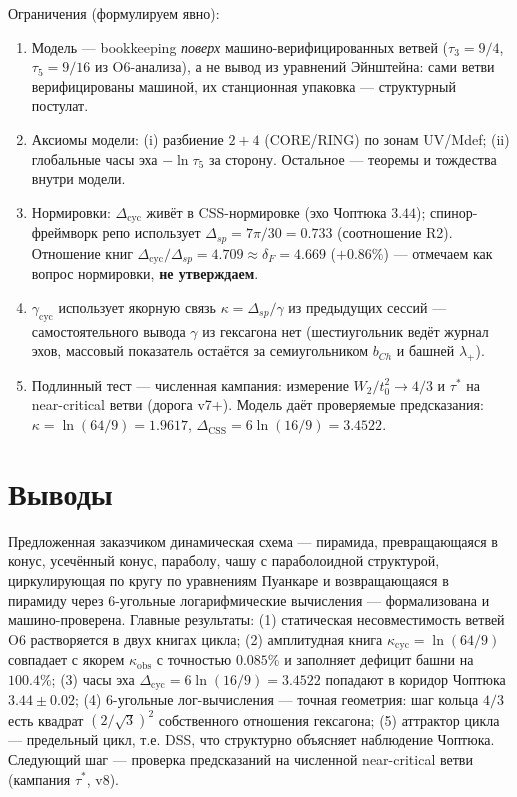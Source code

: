 \documentclass[11pt,a4paper]{article}
\newcommand{\kap}{\kappa_{\mathrm{cyc}}}
\newcommand{\Dcy}{\Delta_{\mathrm{cyc}}}
\newcommand{\tauu}{\tau_{3}}
\newcommand{\tauf}{\tau_{5}}
\begin{document}
Ограничения (формулируем явно):
\begin{enumerate}
\item Модель --- bookkeeping \emph{поверх} машино-верифицированных ветвей
($\tauu = 9/4$, $\tauf = 9/16$ из O6-анализа), а не вывод из уравнений
Эйнштейна: сами ветви верифицированы машиной, их станционная упаковка ---
структурный постулат.
\item Аксиомы модели: (i) разбиение $2+4$ (CORE/RING) по зонам UV/Mdef;
(ii) глобальные часы эха $-\ln\tauf$ за сторону. Остальное --- теоремы и
тождества внутри модели.
\item Нормировки: $\Dcy$ живёт в CSS-нормировке (эхо Чоптюка $3.44$); спинор-фреймворк
репо использует $\Delta_{sp} = 7\pi/30 = 0.733$ (соотношение R2). Отношение
книг $\Dcy/\Delta_{sp} = 4.709 \approx \delta_F = 4.669$ ($+0.86\%$) ---
отмечаем как вопрос нормировки, \textbf{не утверждаем}.
\item $\gamma_{\mathrm{cyc}}$ использует якорную связь
$\kappa = \Delta_{sp}/\gamma$ из предыдущих сессий --- самостоятельного вывода
$\gamma$ из гексагона нет (шестиугольник ведёт журнал эхов, массовый показатель
остаётся за семиугольником $b_{Ch}$ и башней $\lambda_+$).
\item Подлинный тест --- численная кампания: измерение $W_2/t_0^2 \to 4/3$ и
$\tau^*$ на near-critical ветви (дорога v7+). Модель даёт проверяемые
предсказания: $\kappa = \ln(64/9) = 1.9617$,
$\Delta_{\mathrm{CSS}} = 6\ln(16/9) = 3.4522$.
\end{enumerate}

\section{Выводы}

Предложенная заказчиком динамическая схема --- пирамида, превращающаяся в
конус, усечённый конус, параболу, чашу с параболоидной структурой,
циркулирующая по кругу по уравнениям Пуанкаре и возвращающаяся в пирамиду
через 6-угольные логарифмические вычисления --- формализована и
машино-проверена. Главные результаты: (1) статическая несовместимость ветвей
O6 растворяется в двух книгах цикла; (2) амплитудная книга
$\kap = \ln(64/9)$ совпадает с якорем $\kappa_{\mathrm{obs}}$ с точностью
$0.085\%$ и заполняет дефицит башни на $100.4\%$; (3) часы эха
$\Dcy = 6\ln(16/9) = 3.4522$ попадают в коридор Чоптюка $3.44 \pm 0.02$; (4)
6-угольные лог-вычисления --- точная геометрия: шаг кольца $4/3$ есть квадрат
$(2/\sqrt3)^2$ собственного отношения гексагона; (5) аттрактор цикла ---
предельный цикл, т.е. DSS, что структурно объясняет наблюдение Чоптюка.
Следующий шаг --- проверка предсказаний на численной near-critical ветви
(кампания $\tau^*$, v8).
\end{document}
